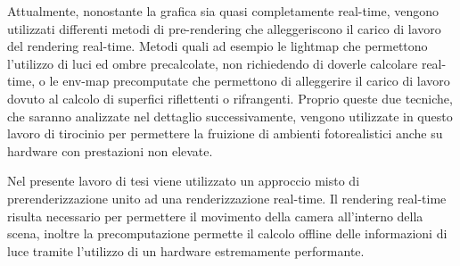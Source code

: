 Attualmente, nonostante la grafica sia quasi completamente real-time, vengono utilizzati differenti metodi di pre-rendering  che alleggeriscono il carico di lavoro del rendering real-time. Metodi quali ad esempio le lightmap che permettono l’utilizzo di luci ed ombre precalcolate, non richiedendo di doverle calcolare real-time, o le env-map precomputate che permettono di alleggerire il carico di lavoro dovuto al calcolo di superfici riflettenti o rifrangenti.
Proprio queste due tecniche, che saranno analizzate nel dettaglio successivamente, vengono utilizzate in questo lavoro di tirocinio per permettere la fruizione di ambienti fotorealistici anche su hardware con prestazioni non elevate. 

Nel presente lavoro di tesi viene utilizzato un approccio misto di prerenderizzazione unito ad una renderizzazione real-time.
Il rendering real-time risulta necessario per permettere il movimento della camera all’interno della scena, inoltre la precomputazione permette il calcolo offline delle informazioni di luce tramite l’utilizzo di un hardware estremamente performante.